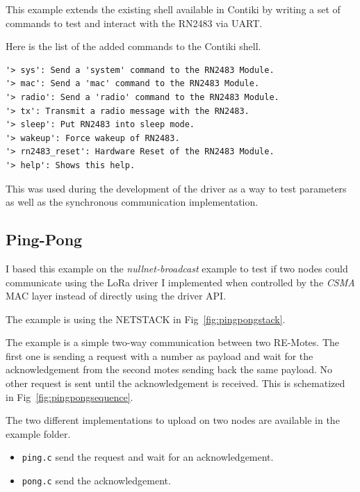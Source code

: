 This example extends the existing shell available in Contiki by writing a set
of commands to test and interact with the RN2483 via UART\@.

Here is the list of the added commands to the Contiki shell.

\begin{lstlisting}[language=none]
'> sys': Send a 'system' command to the RN2483 Module.
'> mac': Send a 'mac' command to the RN2483 Module.
'> radio': Send a 'radio' command to the RN2483 Module.
'> tx': Transmit a radio message with the RN2483.
'> sleep': Put RN2483 into sleep mode.
'> wakeup': Force wakeup of RN2483.
'> rn2483_reset': Hardware Reset of the RN2483 Module.
'> help': Shows this help.
\end{lstlisting}

This was used during the development of the driver as a way to test parameters
as well as the synchronous communication implementation.

\subsection{Ping-Pong\label{section:pingpong}}

I based this example on the \emph{nullnet-broadcast} example to test if two
nodes could communicate using the LoRa driver I implemented when controlled by
the \emph{CSMA} MAC layer instead of directly using the driver API\@.

The example is using the NETSTACK in Fig~\ref{fig:pingpongstack}.



The example is a simple two-way communication between two RE-Motes. 
The first one is sending a request with a number as
payload and wait for the acknowledgement from the second motes sending back
the same payload. 
No other request is sent until the acknowledgement is received.
This is schematized in Fig~\ref{fig:pingpongsequence}.

The two different implementations to upload on two nodes are available in the
example folder.

\begin{itemize}
  \item \lstinline{ping.c} send the request and wait for an acknowledgement.
  \item \lstinline{pong.c} send the acknowledgement.
\end{itemize}



